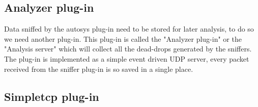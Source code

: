 \subsection{Analyzer plug-in}
Data sniffed by the autosys plug-in need to be stored for later analysis, 
to do so we need another plug-in.
This plug-in is called the "Analyzer plug-in" or the "Analysis server"
which will collect all the dead-drops generated by the sniffers.
The plug-in is implemented as a simple event driven UDP server, every
packet received from the sniffer plug-in is so saved in a single place.

\subsection{Simpletcp plug-in}

